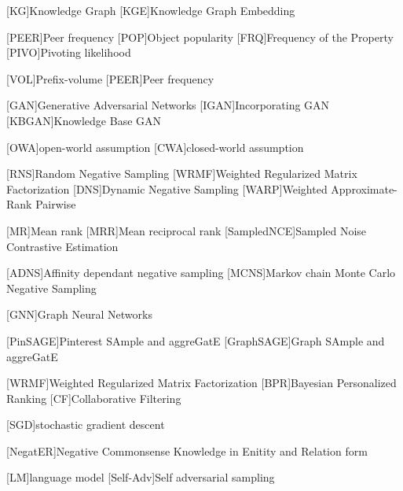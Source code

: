 \begin{acronym}[ECU]

[KG]{Knowledge Graph}
[KGE]{Knowledge Graph Embedding}

[PEER]{Peer frequency}
[POP]{Object popularity }
[FRQ]{Frequency of the Property}
[PIVO]{Pivoting likelihood}

[VOL]{Prefix-volume}
[PEER]{Peer frequency}

[GAN]{Generative Adversarial Networks}
[IGAN]{Incorporating GAN}
[KBGAN]{Knowledge Base GAN}


[OWA]{open-world assumption}
[CWA]{closed-world assumption}

[RNS]{Random Negative Sampling}
[WRMF]{Weighted Regularized Matrix Factorization}
[DNS]{Dynamic Negative Sampling}
[WARP]{Weighted Approximate-Rank Pairwise}

[MR]{Mean rank}
[MRR]{Mean reciprocal rank}
[SampledNCE]{Sampled Noise Contrastive Estimation}

[ADNS]{Affinity dependant negative sampling}
[MCNS]{Markov chain Monte Carlo Negative Sampling}
    
[GNN]{Graph Neural Networks}

[PinSAGE]{Pinterest SAmple and aggreGatE}
[GraphSAGE]{Graph SAmple and aggreGatE}


[WRMF]{Weighted Regularized Matrix Factorization}
[BPR]{Bayesian Personalized Ranking}
[CF]{Collaborative Filtering}

[SGD]{stochastic gradient descent}

[NegatER]{Negative Commonsense Knowledge in Enitity and Relation form}

[LM]{language model}
[Self-Adv]{Self adversarial sampling}
\end{acronym}